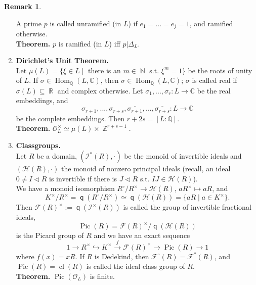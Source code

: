 \documentclass[12pt,a4paper]{report}
\theoremstyle{definition}
\newtheorem{Remark}[theorem]{Remark}
\theoremstyle{num.custom-title}
\DeclareMathOperator{\Hom}{Hom}
\DeclareMathOperator{\N}{\mathbb{N}}
\DeclareMathOperator{\R}{\mathbb{R}}
\DeclareMathOperator{\Z}{\mathbb{Z}}
\DeclareMathOperator{\Pic}{Pic}
\DeclareMathOperator{\sse}{\subseteq}
\DeclareMathOperator{\cl}{cl}
\DeclareMathOperator{\q}{\mathsf{q}}
\newcommand{\ol}{\overline}
\newcommand{\C}{\mathbb{C}}
\newcommand{\F}{\mathcal{F}}
\newcommand{\I}{\mathcal{I}}
\newcommand{\Q}{\mathbb{Q}}
\renewcommand{\H}{\mathcal{H}}
\renewcommand{\O}{\mathcal{O}}
\begin{document}
\begin{Remark}
\begin{enumerate}
\begin{itemize}
\end{itemize}
A prime $p$ is called unramified (in $L$) if $e_1=...=e_j=1$, and ramified otherwise.\\
\textbf{Theorem.} $p$ is ramified (in $L$) iff $p | \Delta_L$.
\item \textbf{Dirichlet's Unit Theorem.}\\
Let $\mu(L)=\{ \xi \in L \mid $ there is an $m \in \N$ s.t. $\xi^m=1\}$ be the roots of unity of $L$. If $\sigma \in \Hom_\Q(L,\C)$, then $\ol{\sigma} \in \Hom_\Q(L,\C)$; $\sigma$ is called real if $\sigma(L) \sse \R$ and complex otherwise. Let $\sigma_1,...,\sigma_r : L \to \C$ be the real embeddings, and \[
\sigma_{r+1},...,\sigma_{r+s}, \ol{\sigma_{r+1}},...,\ol{\sigma_{r+s}} : L \to \C
\]
be the complete embeddings. Then $r+2s = [L:\Q]$.\\
\textbf{Theorem.} $\O_L^\times \simeq \mu(L) \times \Z^{r+s-1}$.
\item \textbf{Classgroups.}\\
Let $R$ be a domain, $(\I^*(R),\cdot)$ be the monoid of invertible ideals and $(\H(R), \cdot)$ the monoid of nonzero principal ideals (recall, an ideal $0 \neq I \lhd R$ is invertible if there is $J \lhd R$ s.t. $IJ \in \H(R)$).\\
We have a monoid isomorphism $R^\circ/R^\times \to \H(R)$, $aR^\times \mapsto aR$, and 
\[
K^\times/R^\times = \q(R^\circ/R^\times) \simeq \q(\H(R)) = \{aR \mid a \in K^\times\}.
\]
Then $\F(R)^\times := \q(\I^\times(R))$ is called the group of invertible fractional ideals, 
\[
\Pic(R) = \F(R)^\times / \q(\H(R))
\]
is the Picard group of $R$ and we have an exact sequence
\[
1 \to R^\times \hookrightarrow K^\times \stackrel{f}{\to} \F(R)^\times \to \Pic(R) \to 1
\]
where $f(x)=xR$. If $R$ is Dedekind, then $\F^\circ(R)=\F^*(R)$, and $\Pic(R)=\cl(R)$ is called the ideal class group of $R$.\\
\textbf{Theorem.} $\Pic(\O_L)$ is finite.
\end{enumerate}
\end{Remark}
\end{document}
